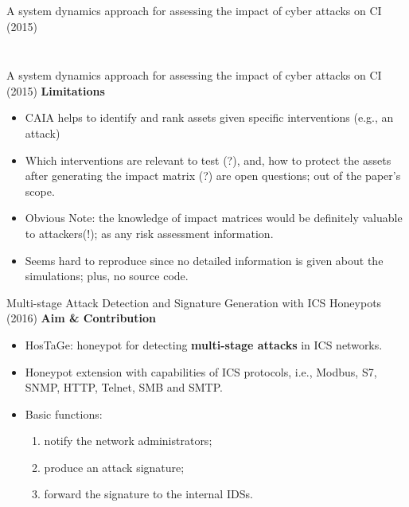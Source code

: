 \documentclass[compress]{beamer}
\begin{document}
\begin{frame}{A system dynamics approach for assessing the impact of cyber attacks on CI (2015)}
\begin{columns}
\begin{column}{0.6\textwidth}
\begin{figure}
      \label{fig:stealthy-operator-view}
      \end{figure}
     \end{column}
    \end{columns}
\end{frame}
\begin{frame}{A system dynamics approach for assessing the impact of cyber attacks on CI (2015)}
    \textbf{Limitations}
    \begin{itemize}
     \item CAIA helps to identify and rank assets given specific interventions (e.g., an attack)
     \item Which interventions are relevant to test (?), and, how to protect the assets after generating the impact matrix (?) are open questions; out of the paper's scope.
     \item Obvious Note: the knowledge of impact matrices would be definitely valuable to attackers(!); as any risk assessment information.
     \item Seems hard to reproduce since no detailed information is given about the simulations; plus, no source code.
    \end{itemize}
\end{frame}
\begin{frame}{Multi-stage Attack Detection and Signature Generation with ICS Honeypots (2016)}
    \textbf{Aim \& Contribution}
    \begin{itemize}
     \item HosTaGe: honeypot for detecting \textbf{multi-stage attacks} in ICS networks.
     \item Honeypot extension with capabilities of ICS protocols, i.e., Modbus, S7, SNMP, HTTP, Telnet, SMB and SMTP.
     \item Basic functions:
     \begin{enumerate}
      \item notify the network administrators;
      \item produce an attack signature;
      \item forward the signature to the internal IDSs.
     \end{enumerate}
    \end{itemize}
\end{frame}
\end{document}
